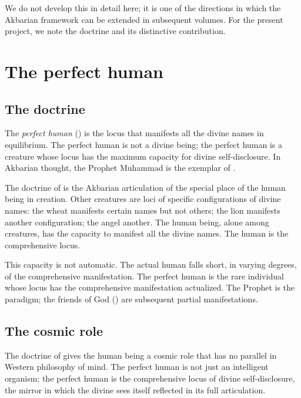 We do not develop this in detail here; it is one of the directions
in which the Akbarian framework can be extended in subsequent
volumes. For the present project, we note the doctrine and its
distinctive contribution.

\section{The perfect human}
\label{sec:perfect-human}

\subsection{The doctrine}

\begin{definition}
\label{def:perfect-human}
The \emph{perfect human} () is the locus that
manifests all the divine names in equilibrium. The perfect human is
not a divine being; the perfect human is a creature whose locus has
the maximum capacity for divine self-disclosure. In Akbarian
thought, the Prophet Muhammad is the exemplar of .
\end{definition}

The doctrine of  is the Akbarian articulation of
the special place of the human being in creation. Other creatures
are loci of specific configurations of divine names: the wheat
manifests certain names but not others; the lion manifests another
configuration; the angel another. The human being, alone among
creatures, has the capacity to manifest all the divine names. The
human is the comprehensive locus.

This capacity is not automatic. The actual human falls short, in
varying degrees, of the comprehensive manifestation. The perfect
human is the rare individual whose locus has the comprehensive
manifestation actualized. The Prophet is the paradigm; the friends
of God () are subsequent partial manifestations.

\subsection{The cosmic role}

The doctrine of  gives the human being a
cosmic role that has no parallel in Western philosophy of mind. The
perfect human is not just an intelligent organism; the perfect
human is the comprehensive locus of divine self-disclosure, the
mirror in which the divine sees itself reflected in its full
articulation.

